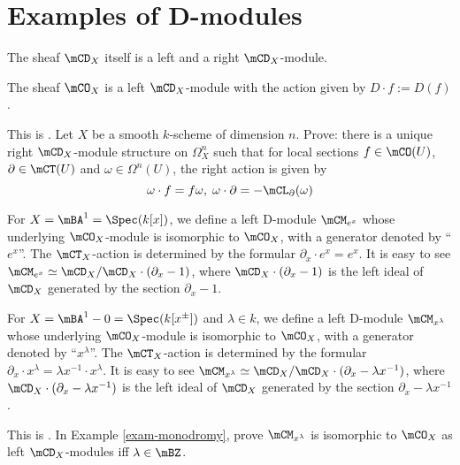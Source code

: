 \section{Examples of D-modules}

	\begin{exam}
		The sheaf $\mCD_X$ itself is a left and a right $\mCD_X$-module.
	\end{exam}

	\begin{exam}
		The sheaf $\mCO_X$ is a left $\mCD_X$-module with the action given by $D\cdot f:=D(f)$.
	\end{exam}

	\begin{exe}
		This is . Let $X$ be a smooth $k$-scheme of dimension $n$. Prove: there is a unique right $\mCD_X$-module structure on $\Omega_X^n$ such that for local sections $f\in \mCO(U)$, $\partial\in \mCT(U)$ and $\omega\in \Omega^n(U)$, the right action is given by
		\[
			\omega \cdot f = f\omega,\; \omega \cdot \partial = -\mCL_\partial(\omega)
		\]
	\end{exe}

	\begin{exam}
		For $X=\mBA^1=\Spec (k[x])$, we define a left D-module $\mCM_{e^x}$ whose underlying $\mCO_X$-module is isomorphic to $\mCO_X$, with a generator denoted by ``$e^x$''. The $\mCT_X$-action is determined by the formular $\partial_x \cdot e^x = e^x$. It is easy to see $\mCM_{e^x} \simeq \mCD_X/\mCD_X\cdot(\partial_x-1)$, where $\mCD_X\cdot(\partial_x-1)$ is the left ideal of $\mCD_X$ generated by the section $\partial_x-1$.
	\end{exam}

	\begin{exam}
		\label{exam-monodromy}
		For $X=\mBA^1-0=\Spec (k[x^\pm])$ and $\lambda\in k$, we define a left D-module $\mCM_{x^\lambda}$ whose underlying $\mCO_X$-module is isomorphic to $\mCO_X$, with a generator denoted by ``$x^\lambda$''. The $\mCT_X$-action is determined by the formular $\partial_x \cdot x^\lambda = \lambda x^{-1}\cdot x^{\lambda}$. It is easy to see $\mCM_{x^\lambda} \simeq \mCD_X/\mCD_X\cdot(\partial_x-\lambda x^{-1})$, where $\mCD_X\cdot(\partial_x-\lambda x^{-1})$ is the left ideal of $\mCD_X$ generated by the section $\partial_x-\lambda x^{-1}$.
	\end{exam}

	\begin{exe}
		This is . In Example \ref{exam-monodromy}, prove $\mCM_{x^\lambda}$ is isomorphic to $\mCO_X$ as left $\mCD_X$-modules iff $\lambda\in \mBZ$.
	\end{exe}
	

